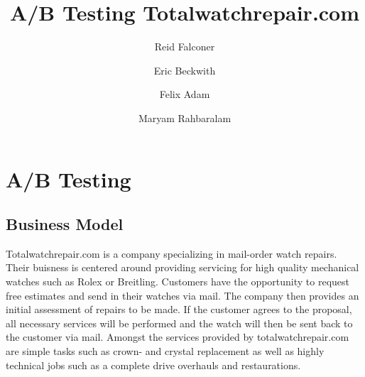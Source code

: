 \documentclass[12pt, authoryear]{elsarticle}
\begin{document}
\begin{frontmatter}  %

\title{A/B Testing Totalwatchrepair.com}

\author[Add1]{Reid Falconer}

\author[Add1]{Eric Beckwith}

\author[Add1]{Felix Adam}
\author[Add1]{Maryam Rahbaralam}

\address[Add1]{Barcelona Graduate School of Economics, Barcelona, Spain}




\end{frontmatter}

\headsep 35pt %
\section{A/B Testing }\label{ab_testing}

\subsection{Business Model}
Totalwatchrepair.com is a company specializing in mail-order watch repairs. Their buisness is centered around providing servicing for high quality mechanical watches such as Rolex or Breitling.  Customers have the opportunity to request free estimates and send in their watches via mail. The company then provides an initial assessment of repairs to be made. If the customer agrees to the proposal, all necessary services will be performed and the watch will then be sent back to the customer via mail. 
Amongst the services provided by totalwatchrepair.com are simple tasks such as crown- and crystal replacement as well as highly technical jobs such as a complete drive overhauls and restaurations. 
\end{document}
